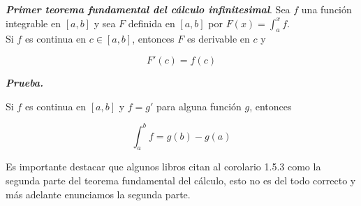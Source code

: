 \documentclass{report}
\begin{document}
    \begin{thBox}
        \textit{\textbf{Primer teorema fundamental del cálculo infinitesimal}}. Sea $f$ una función integrable en $[a,b]$ y sea $F$ definida en $[a,b]$ por $F(x) = \int_{a}^{x}f$.\\
        Si $f$ es continua en $c \in [a,b]$, entonces $F$ es derivable en $c$ y

        $$F'(c) = f(c)$$
    \end{thBox}

    \textit{\textbf{Prueba.}}

    \begin{corBox}
        Si $f$ es continua en $[a,b]$ y $f = g'$ para alguna función $g$, entonces

        $$\int_{a}^{b}f = g(b) - g(a)$$
    \end{corBox}

    \begin{noteBox}
        Es importante destacar que algunos libros citan al corolario 1.5.3 como la segunda parte del teorema fundamental del cálculo, esto no es del todo correcto y más adelante enunciamos la segunda parte.
    \end{noteBox}

    
\end{document}
